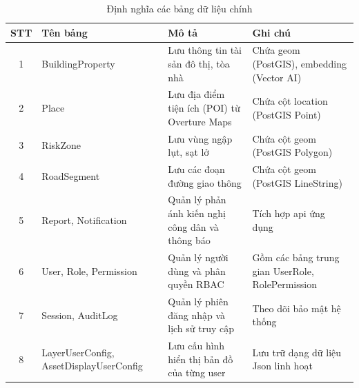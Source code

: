 \begin{table}[H]
    \centering
    \begin{tabular}{|c|p{4cm}|p{5cm}|p{4.5cm}|}
    \hline
    \textbf{STT} & \textbf{Tên bảng} & \textbf{Mô tả} & \textbf{Ghi chú} \\
    \hline
    1 & BuildingProperty & Lưu thông tin tài sản đô thị, tòa nhà & Chứa geom (PostGIS), embedding (Vector AI) \\
    \hline
    2 & Place & Lưu địa điểm tiện ích (POI) từ Overture Maps & Chứa cột location (PostGIS Point) \\
    \hline
    3 & RiskZone & Lưu vùng ngập lụt, sạt lở & Chứa cột geom (PostGIS Polygon) \\
    \hline
    4 & RoadSegment & Lưu các đoạn đường giao thông & Chứa cột geom (PostGIS LineString) \\
    \hline
    5 & Report, Notification & Quản lý phản ánh kiến nghị công dân và thông báo & Tích hợp \gls{api} ứng dụng \\
    \hline
    6 & User, Role, Permission & Quản lý người dùng và phân quyền RBAC & Gồm các bảng trung gian UserRole, RolePermission \\
    \hline
    7 & Session, AuditLog & Quản lý phiên đăng nhập và lịch sử truy cập & Theo dõi bảo mật hệ thống \\
    \hline
    8 & LayerUserConfig, AssetDisplayUserConfig & Lưu cấu hình hiển thị bản đồ của từng user & Lưu trữ dạng dữ liệu Json linh hoạt \\
    \hline
    \end{tabular}
    \caption{Định nghĩa các bảng dữ liệu chính}
    \label{tab:db_tables}
\end{table}